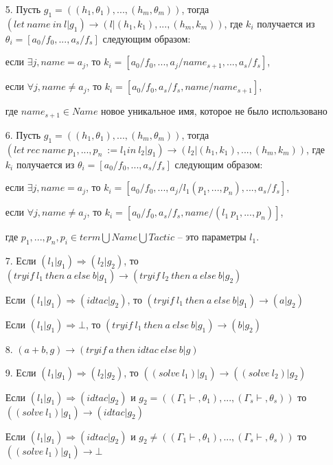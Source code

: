 \documentclass[12pt]{article}
\begin{document}
\begin{enumerate}
    \item[5.] Пусть $g_1 = ((h_{1}, \theta_1), ..., (h_{m}, \theta_m))$, тогда 
    $(let\ name\ in\ l|g_1) \xrightarrow{} (l|(h_{1}, k_1), ..., (h_{m}, k_m))$, где $k_i$ получается из $\theta_i=[a_0/f_0,...,a_s/f_s]$ следующим образом: 
    \item[]   если $\exists j, name = a_j$, 
    то $k_i = [a_0/f_0,...,a_j/name_{s+1},..., a_s/f_s]$, 
    \item[]   если $\forall j,name \neq a_j$, 
    то $k_i = [a_0/f_0, a_s/f_s, name/name_{s+1}]$, 
    \item[]   где $name_{s+1} \in Name$ новое уникальное имя, которое не было использовано
    \item[6.] Пусть $g_1 = ((h_{1}, \theta_1), ..., (h_{m}, \theta_m))$, тогда 
    $(let\ rec\ name\ p_1,...,p_n\ := l_1 in\ l_2|g_1) \xrightarrow{} (l_2|(h_{1}, k_1), ..., (h_{m}, k_m))$, где $k_i$ получается из $\theta_i=[a_0/f_0,..., a_s/f_s]$ следующим образом: 
    \item[]   если $\exists j, name = a_j$, 
    то $k_i = [a_0/f_0,...,a_j/l_1(p_1,...,p_n),..., a_s/f_s]$, 
    \item[]   если $\forall j,name \neq a_j$, 
    то $k_i = [a_0/f_0, a_s/f_s, name/(l_1\ p_1,...,p_n)]$, 
    \item[]   где $p_1,...,p_n, p_i \in term \bigcup Name \bigcup Tactic$ -- это параметры $l_1$.

    
    \item[7.] Если $(l_1|g_1) \Rightarrow (l_2|g_2)$, то
    $(tryif\ l_1\ then\ a\ else\ b|g_1) \xrightarrow{} (tryif\ l_2\ then\ a\ else\ b|g_2)$
    \item[]   Если $(l_1|g_1) \Rightarrow (idtac|g_2)$, то
    $(tryif\ l_1\ then\ a\ else\ b|g_1) \xrightarrow{} (a|g_2)$
    \item[]   Если $(l_1|g_1) \Rightarrow \bot$, то
    $(tryif\ l_1\ then\ a\ else\ b|g_1) \xrightarrow{} (b|g_2)$
    \item[8.] $(a+b,g) \xrightarrow{} (tryif\ a\ then\ idtac\ else\ b| g)$
    \item[9.] Если $(l_1|g_1) \Rightarrow (l_2|g_2)$, то
    $((solve\ l_1)|g_1) \xrightarrow{} ((solve\ l_2)|g_2)$
    \item[]   Если $(l_1|g_1) \Rightarrow{} (idtac|g_2)$ и $g_2 = ((\Gamma_1 \vdash, \theta_1),...,(\Gamma_s \vdash, \theta_s))$ то
    $((solve\ l_1)|g_1) \xrightarrow{} (idtac|g_2)$
    \item[]   Если $(l_1|g_1) \Rightarrow{} (idtac|g_2)$ и $g_2 \neq ((\Gamma_1 \vdash, \theta_1),...,(\Gamma_s \vdash, \theta_s))$ то
    $((solve\ l_1)|g_1) \xrightarrow{} \bot$


\end{enumerate}
\end{document}

